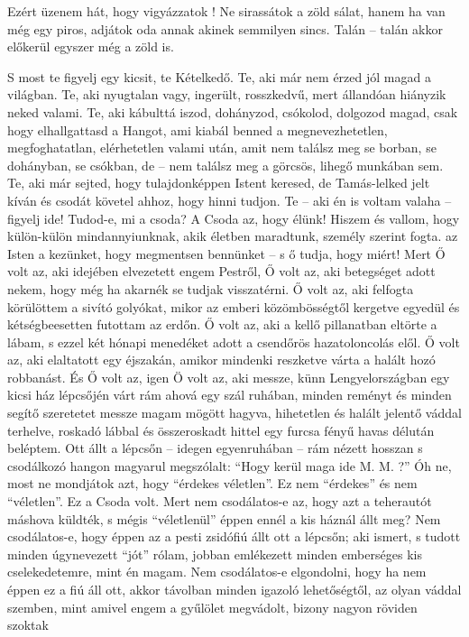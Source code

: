 \documentclass{IEEEtran}
\begin{document}
Ezért üzenem hát, hogy vigyázzatok ! Ne sirassátok a zöld sálat, hanem ha van
még egy piros, adjátok oda annak akinek semmilyen sincs. Talán – talán akkor
előkerül egyszer még a zöld is.

S most te figyelj egy kicsit, te Kételkedő. Te, aki már nem érzed jól magad a
világban. Te, aki nyugtalan vagy, ingerült, rosszkedvű, mert állandóan
hiányzik neked valami. Te, aki kábulttá iszod, dohányzod, csókolod, dolgozod
magad, csak hogy elhallgattasd a Hangot, ami kiabál benned a megnevezhetetlen,
megfoghatatlan, elérhetetlen valami után, amit nem találsz meg se borban, se
dohányban, se csókban, de – nem találsz meg a görcsös, lihegő munkában sem.
Te, aki már sejted, hogy tulajdonképpen Istent keresed, de Tamás-lelked jelt
kíván és csodát követel ahhoz, hogy hinni tudjon. Te – aki én is voltam valaha
– figyelj ide! Tudod-e, mi a csoda?
A Csoda az, hogy élünk! Hiszem és vallom, hogy külön-külön mindannyiunknak,
akik életben maradtunk, személy szerint fogta. az Isten a kezünket, hogy
megmentsen bennünket – s ő tudja, hogy miért! Mert Ő volt az, aki idejében
elvezetett engem Pestről, Ő volt az, aki betegséget adott nekem, hogy még ha
akarnék se tudjak visszatérni. Ő volt az, aki felfogta körülöttem a sivító
golyókat, mikor az emberi közömbösségtől kergetve egyedül és kétségbeesetten
futottam az erdőn. Ő volt az, aki a kellő pillanatban eltörte a lábam, s ezzel
két hónapi menedéket adott a csendőrös hazatoloncolás elől. Ő volt az, aki
elaltatott egy éjszakán, amikor mindenki reszketve várta a halált hozó
robbanást. És Ő volt az, igen Ö volt az, aki messze, künn Lengyelországban egy
kicsi ház lépcsőjén várt rám ahová egy szál ruhában, minden reményt és minden
segítő szeretetet messze magam mögött hagyva, hihetetlen és halált jelentő
váddal terhelve, roskadó lábbal és összeroskadt hittel egy furcsa fényű havas
délután beléptem. Ott állt a lépcsőn – idegen egyenruhában – rám nézett
hosszan s csodálkozó hangon magyarul megszólalt: “Hogy kerül maga ide M. M. ?”
Óh ne, most ne mondjátok azt, hogy “érdekes véletlen”. Ez nem “érdekes” és nem
“véletlen”. Ez a Csoda volt. Mert nem csodálatos-e az, hogy azt a teherautót
máshova küldték, s mégis “véletlenül” éppen ennél a kis háznál állt meg? Nem
csodálatos-e, hogy éppen az a pesti zsidófiú állt ott a lépcsőn; aki ismert, s
tudott minden úgynevezett “jót” rólam, jobban emlékezett minden emberséges kis
cselekedetemre, mint én magam. Nem csodálatos-e elgondolni, hogy ha nem éppen
ez a fiú áll ott, akkor távolban minden igazoló lehetőségtől, az olyan váddal
szemben, mint amivel engem a gyűlölet megvádolt, bizony nagyon röviden szoktak
\end{document}
